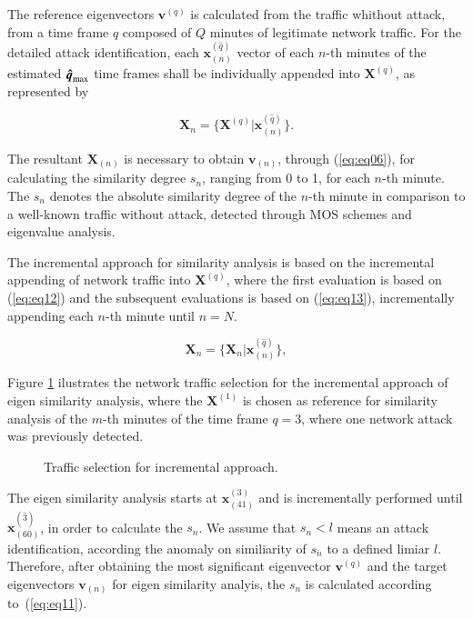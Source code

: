 \documentclass[review]{elsarticle}
\begin{document}
The reference eigenvectors $\boldsymbol{v}^{(q)}$ is calculated from the traffic whithout attack, from a time frame $q$ composed of $Q$ minutes of legitimate network traffic. For the detailed attack identification, each $\boldsymbol{x}^{(\hat{q})}_{(n)}$ vector of each $n$-th minutes of the estimated $\rm{\boldsymbol{\hat{q}}}_{\rm max}$ time frames shall be individually appended into $\boldsymbol{X}^{(q)}$, as represented by

\begin{equation}\label{eq:eq12}
\boldsymbol{X}_{n} = \{\boldsymbol{X}^{(q)} | \boldsymbol{x}^{(\hat{q})}_{(n)}\}.
\end{equation}

The resultant $\boldsymbol{X}_{(n)}$ is necessary to obtain $\boldsymbol{v}_{(n)}$, through (\ref{eq:eq06}), for calculating the similarity degree $s_n$, ranging from 0 to 1, for each $n$-th minute. The $s_n$ denotes the absolute similarity degree of the $n$-th minute in comparison to a well-known traffic without attack, detected through MOS schemes and eigenvalue analysis.

The incremental approach for similarity analysis is based on the incremental appending of network traffic into $\boldsymbol{X}^{(q)}$, where the first evaluation is based on (\ref{eq:eq12}) and the subsequent evaluations is based on (\ref{eq:eq13}), incrementally appending each $n$-th minute until $n=N$.

\begin{equation}\label{eq:eq13}
\boldsymbol{X}_{n} = \{\boldsymbol{X}_{n} | \boldsymbol{x}^{(\hat{q})}_{(n)}\},
\end{equation}

Figure \ref{fig:fig8} ilustrates the network traffic selection for the incremental approach of eigen similarity analysis, where the $\boldsymbol{X}^{(1)}$ is chosen as reference for similarity analysis of the $m$-th minutes of the time frame $q=3$, where one network attack was previously detected. 

\begin{figure}[h!]
     \caption{Traffic selection for incremental approach.}
     \label{fig:fig8}
\end{figure}

The eigen similarity analysis starts at $\boldsymbol{x}^{(3)}_{(41)}$ and is incrementally performed until $\boldsymbol{x}^{(\hat{3})}_{(60)}$, in order to calculate the $s_n$. We assume that $s_n < l$ means an attack identification, according the anomaly on similiarity of $s_n$ to a defined limiar $l$. Therefore, after obtaining the most significant eigenvector $\boldsymbol{v}^{(q)}$ and the target eigenvectors $\boldsymbol{v}_{(n)}$ for eigen similarity analyis, the $s_n$ is calculated according to~(\ref{eq:eq11}).
\end{document}
